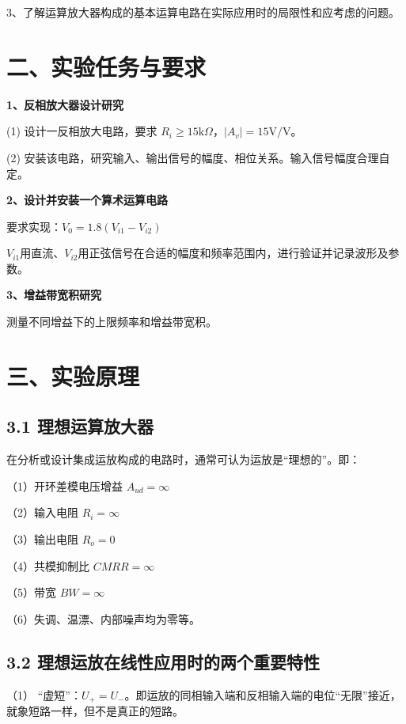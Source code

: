 \documentclass[12pt,a4paper]{article}
\begin{document}
3、了解运算放大器构成的基本运算电路在实际应用时的局限性和应考虑的问题。



\section*{二、实验任务与要求}

\textbf{1、反相放大器设计研究}

(1) 设计一反相放大电路，要求 \( R_i \geq 15\text{k}\Omega \)，\( |A_v| = 15\text{V/V} \)。

(2) 安装该电路，研究输入、输出信号的幅度、相位关系。输入信号幅度合理自定。

\textbf{2、设计并安装一个算术运算电路}

要求实现：\( V_0 = 1.8(V_{i1} - V_{i2}) \)

\( V_{i1} \)用直流、\( V_{i2} \)用正弦信号在合适的幅度和频率范围内，进行验证并记录波形及参数。

\textbf{3、增益带宽积研究}

测量不同增益下的上限频率和增益带宽积。

\section*{三、实验原理}

\subsection*{3.1 理想运算放大器}

在分析或设计集成运放构成的电路时，通常可认为运放是“理想的”。即：

（1）开环差模电压增益 \( A_{ud} = \infty \)

（2）输入电阻 \( R_i = \infty \)
    
（3）输出电阻 \( R_o = 0 \)
    
（4）共模抑制比 \( CMRR = \infty \)
    
（5）带宽 \( BW = \infty \)
    
（6）失调、温漂、内部噪声均为零等。



\subsection*{3.2 理想运放在线性应用时的两个重要特性}

（1） “虚短”：\( U_+ = U_- \)。即运放的同相输入端和反相输入端的电位“无限”接近，就象短路一样，但不是真正的短路。
\end{document}
